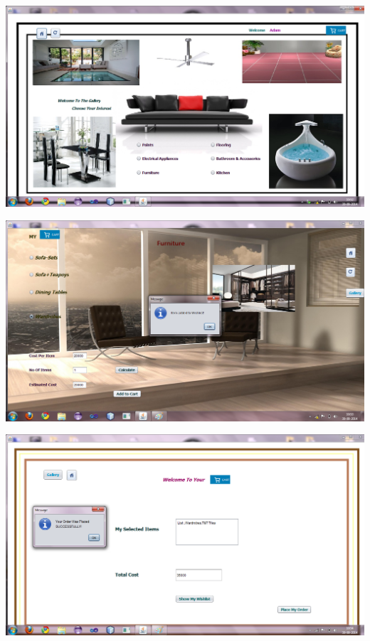 \documentclass[12pt,a4paper]{report}
\begin{document}
\begin{center}
\includegraphics[scale=0.45]{20 (1).png}
\end{center}
\begin{center}
\includegraphics[scale=0.45]{20 (2).png}
\end{center}
\begin{center}
\includegraphics[scale=0.45]{20 (3).png}
\end{center}
\end{document}
